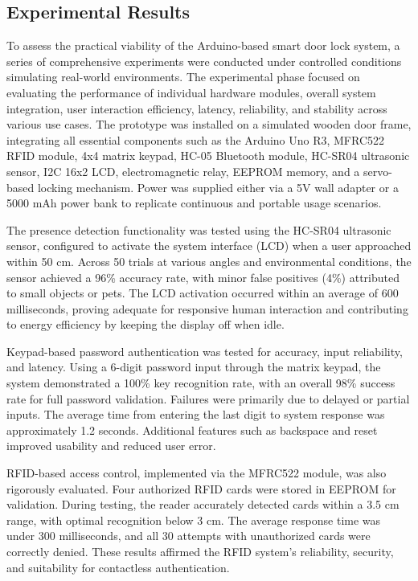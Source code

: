 \documentclass[conference, onecolumn]{IEEEtran}
\begin{document}
\subsection{Experimental Results}

To assess the practical viability of the Arduino-based smart door lock system, a series of comprehensive experiments were conducted under controlled conditions simulating real-world environments. The experimental phase focused on evaluating the performance of individual hardware modules, overall system integration, user interaction efficiency, latency, reliability, and stability across various use cases. The prototype was installed on a simulated wooden door frame, integrating all essential components such as the Arduino Uno R3, MFRC522 RFID module, 4x4 matrix keypad, HC-05 Bluetooth module, HC-SR04 ultrasonic sensor, I2C 16x2 LCD, electromagnetic relay, EEPROM memory, and a servo-based locking mechanism. Power was supplied either via a 5V wall adapter or a 5000 mAh power bank to replicate continuous and portable usage scenarios.

The presence detection functionality was tested using the HC-SR04 ultrasonic sensor, configured to activate the system interface (LCD) when a user approached within 50 cm. Across 50 trials at various angles and environmental conditions, the sensor achieved a 96\% accuracy rate, with minor false positives (4\%) attributed to small objects or pets. The LCD activation occurred within an average of 600 milliseconds, proving adequate for responsive human interaction and contributing to energy efficiency by keeping the display off when idle.

Keypad-based password authentication was tested for accuracy, input reliability, and latency. Using a 6-digit password input through the matrix keypad, the system demonstrated a 100\% key recognition rate, with an overall 98\% success rate for full password validation. Failures were primarily due to delayed or partial inputs. The average time from entering the last digit to system response was approximately 1.2 seconds. Additional features such as backspace and reset improved usability and reduced user error.

RFID-based access control, implemented via the MFRC522 module, was also rigorously evaluated. Four authorized RFID cards were stored in EEPROM for validation. During testing, the reader accurately detected cards within a 3.5 cm range, with optimal recognition below 3 cm. The average response time was under 300 milliseconds, and all 30 attempts with unauthorized cards were correctly denied. These results affirmed the RFID system's reliability, security, and suitability for contactless authentication.
\end{document}
